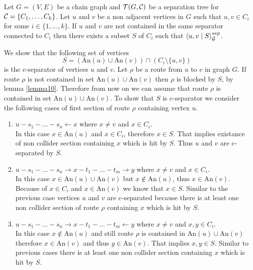 \begin{lemma} \label{lemma11}
	Let $G = (V, E)$ be a chain graph and $\mathcal{T}(G, \mathcal{C})$ be a separation tree for $\mathcal{C} = \{C_1, \dots, C_k \}$. 
	Let $u$ and $v$ be a non adjacent vertices in $G$ such that $u, v \in C_i$ for some $i \in \{1, \dots, k \}$. 
	If $u$ and $v$ are not contained in the same separator connected to $C_i$ then there exists a subset $S$ of $C_i$ such that
	$\left\langle u , v \mid S \right\rangle_{\mathcal{G}}^{sep}$.
\end{lemma}

\begin{prf}
	We show that the following set of vertices 
	\begin{equation} \label{eq:S}
		S = \left( \mbox{An}(u) \cup \mbox{An}(v) \right) \cap \left( C_i \setminus \{ u, v\} \right)
	\end{equation} 
	is the c-separator of vertices $u$ and $v$. Let $\rho$ be a route from $u$ to $v$ in graph $G$. If route $\rho$ is not contained in 
	set $\mbox{An}(u) \cup \mbox{An}(v)$ then $\rho$ is blocked by $S$, by lemma \ref{lemma10}. Therefore from now on we can assume that
	route $\rho$ is contained in set $\mbox{An}(u) \cup \mbox{An}(v)$. To show that $S$ is c-separator we consider the following cases of
	first section of route $\rho$ containing vertex $u$.

	\begin{enumerate}
		\item $u - s_1 - \dots - s_n \leftarrow x$ where $x \neq v$ and $x \in C_i$. \\ 
			In this case $x \in \mbox{An}(u)$ and $x\in C_i$, therefore $x \in S$. That implies
			existance of non collider section containing $x$ which is hit by $S$. Thus $u$ and $v$ 
			are c-separated by $S$.

		\item $u - s_1 - \dots - s_n \rightarrow x - t_1 - \dots - t_m \rightarrow y$ where $x \neq v$ and $x \in C_i$. \\ 
			In this case $x \in \mbox{An}(u) \cup \mbox{An}(v)$ but $x \notin \mbox{An}(u)$, thus $x \in \mbox{An}(v)$.
			Because of $x \in C_i$ and $x \in \mbox{An}(v)$ we know that $x \in S$. Similar to the previous case
			vertices $u$ and $v$ are c-separated because there is at least one non collider section of route $\rho$ 
			containing $x$ which is hit by $S$.

		\item $u - s_1 - \dots - s_n \rightarrow x - t_1 - \dots - t_m \leftarrow y$ where $x \neq v$ and $x,y \in C_i$. \\ 
			In this case $x \not\in \mbox{An}(u)$ and still route $\rho$ is contained in $\mbox{An}(u) \cup \mbox{An}(v)$
			therefore $x \in \mbox{An}(v)$ and thus $y \in \mbox{An}(v)$. That implies $x, y \in S$. Similar to previous 
			cases there is at least one non collider section containing $x$ which is hit by $S$.


\end{enumerate}
\end{prf}

